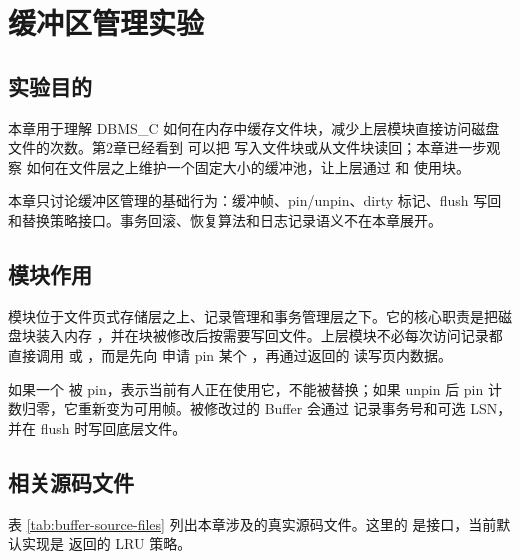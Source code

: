 \chapter{缓冲区管理实验}
\label{chap:buffer}

\section{实验目的}
\label{sec:buffer-purpose}

本章用于理解 DBMS\_C 如何在内存中缓存文件块，减少上层模块直接访问磁盘文件的次数。第2章已经看到  可以把  写入文件块或从文件块读回；本章进一步观察  如何在文件层之上维护一个固定大小的缓冲池，让上层通过  和  使用块。

本章只讨论缓冲区管理的基础行为：缓冲帧、pin/unpin、dirty 标记、flush 写回和替换策略接口。事务回滚、恢复算法和日志记录语义不在本章展开。

\section{模块作用}
\label{sec:buffer-role}

 模块位于文件页式存储层之上、记录管理和事务管理层之下。它的核心职责是把磁盘块装入内存 ，并在块被修改后按需要写回文件。上层模块不必每次访问记录都直接调用  或 ，而是先向  申请 pin 某个 ，再通过返回的  读写页内数据。

如果一个  被 pin，表示当前有人正在使用它，不能被替换；如果 unpin 后 pin 计数归零，它重新变为可用帧。被修改过的 Buffer 会通过  记录事务号和可选 LSN，并在 flush 时写回底层文件。

\section{相关源码文件}
\label{sec:buffer-source-files}

表 \ref{tab:buffer-source-files} 列出本章涉及的真实源码文件。这里的  是接口，当前默认实现是  返回的 LRU 策略。

